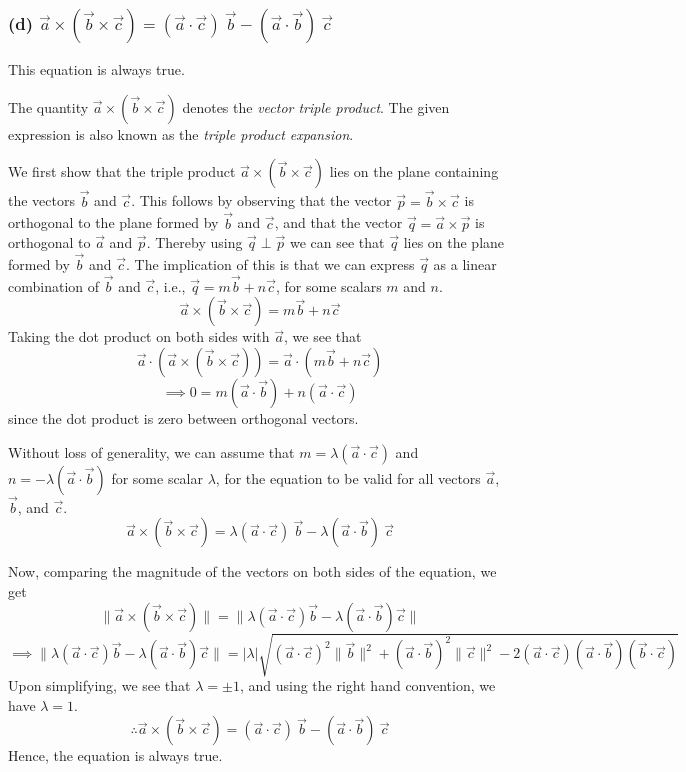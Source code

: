 \newpage
\subsubsection*{(d) \( \vec{a} \times (\vec{b} \times \vec{c}) = (\vec{a} \cdot \vec{c})\ \vec{b} - (\vec{a} \cdot \vec{b})\ \vec{c} \)}

This equation is always true.

The quantity \( \vec{a} \times (\vec{b} \times \vec{c}) \) denotes the \textit{vector triple product}.
The given expression is also known as the \textit{triple product expansion}.

We first show that the triple product \( \vec{a} \times (\vec{b} \times \vec{c}) \) lies on the plane containing the vectors \( \vec{b} \) and  \( \vec{c} \).
This follows by observing that the vector \( \vec{p} = \vec{b} \times \vec{c}\) is orthogonal to the plane formed by \( \vec{b} \) and  \( \vec{c} \), and that the vector \( \vec{q} = \vec{a} \times \vec{p} \) is orthogonal to \( \vec{a} \) and \( \vec{p} \).
Thereby using \( \vec{q} \perp \vec{p} \) we can see that \( \vec{q} \) lies on the plane formed by \( \vec{b} \) and  \( \vec{c} \).
The implication of this is that we can express \( \vec{q} \) as a linear combination of \( \vec{b} \) and  \( \vec{c} \), i.e., \( \vec{q} = m\vec{b} + n\vec{c} \), for some scalars \( m \) and \( n \).
\begin{equation*}
    \vec{a} \times (\vec{b} \times \vec{c}) = m\vec{b} + n\vec{c}
\end{equation*}
Taking the dot product on both sides with \( \vec{a} \), we see that
\[
    \vec{a} \cdot (\vec{a} \times (\vec{b} \times \vec{c})) = \vec{a} \cdot (m\vec{b} + n\vec{c})
\]
\[
    \implies 0 = m(\vec{a} \cdot \vec{b}) + n(\vec{a} \cdot \vec{c})
\]
since the dot product is zero between orthogonal vectors.

Without loss of generality, we can assume that \( m = \lambda(\vec{a} \cdot \vec{c}) \) and \( n = -\lambda(\vec{a} \cdot \vec{b}) \) for some scalar \( \lambda \), for the equation to be valid for all vectors \( \vec{a} \), \( \vec{b} \), and \( \vec{c} \).
\begin{equation*}
    \vec{a} \times (\vec{b} \times \vec{c}) = \lambda (\vec{a} \cdot \vec{c})\ \vec{b} - \lambda (\vec{a} \cdot \vec{b})\ \vec{c}
\end{equation*}

Now, comparing the magnitude of the vectors on both sides of the equation, we get
\[
    \lVert \vec{a} \times (\vec{b} \times \vec{c}) \rVert
    = \lVert \lambda (\vec{a} \cdot \vec{c}) \vec{b} - \lambda (\vec{a} \cdot \vec{b}) \vec{c} \rVert
\]
\[
    \implies
    \lVert \lambda (\vec{a} \cdot \vec{c}) \vec{b} - \lambda (\vec{a} \cdot \vec{b}) \vec{c} \rVert
    = \lvert \lambda \rvert \sqrt{ {(\vec{a} \cdot \vec{c})}^2 \lVert \vec{b} \rVert ^2 + {(\vec{a} \cdot \vec{b})}^2 \lVert \vec{c} \rVert ^2 - 2 (\vec{a} \cdot \vec{c})(\vec{a} \cdot \vec{b})(\vec{b} \cdot \vec{c}) }
\]
Upon simplifying, we see that \( \lambda = \pm 1 \), and using the right hand convention, we have \( \lambda =  1 \).
\[
    \therefore \vec{a} \times (\vec{b} \times \vec{c}) = (\vec{a} \cdot \vec{c})\ \vec{b} - (\vec{a} \cdot \vec{b})\ \vec{c}
\]
Hence, the equation is always true.
